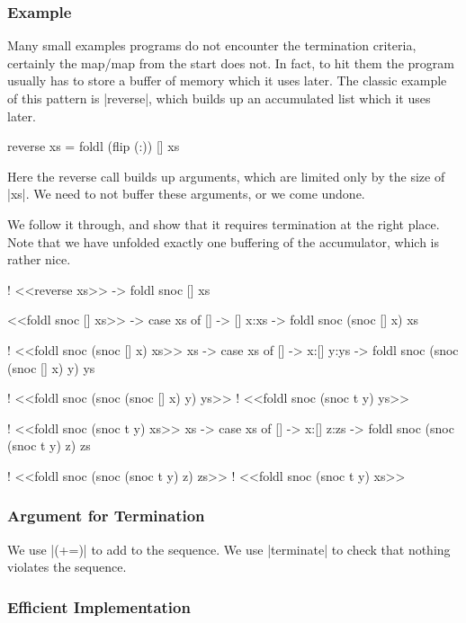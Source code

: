 \documentclass{sigplanconf}
\begin{document}
\subsubsection{Example}

Many small examples programs do not encounter the termination criteria, certainly the map/map from the start does not. In fact, to hit them the program usually has to store a buffer of memory which it uses later. The classic example of this pattern is |reverse|, which builds up an accumulated list which it uses later.

\begin{code}
reverse xs = foldl (flip (:)) [] xs
\end{code}

Here the reverse call builds up arguments, which are limited only by the size of |xs|. We need to not buffer these arguments, or we come undone.

We follow it through, and show that it requires termination at the right place. Note that we have unfolded exactly one buffering of the accumulator, which is rather nice.

\begin{code}
! <<reverse xs>>
\xs -> foldl snoc [] xs

<<foldl snoc [] xs>>
\xs -> case xs of
    [] -> []
    x:xs -> foldl snoc (snoc [] x) xs

! <<foldl snoc (snoc [] x) xs>>
\x xs -> case xs of
    [] -> x:[]
    y:ys -> foldl snoc (snoc (snoc [] x) y) ys

! <<foldl snoc (snoc (snoc [] x) y) ys>>
! <<foldl snoc (snoc t y) ys>>

! <<foldl snoc (snoc t y) xs>>
\x xs -> case xs of
    [] -> x:[]
    z:zs -> foldl snoc (snoc (snoc t y) z) zs

! <<foldl snoc (snoc (snoc t y) z) zs>>
! <<foldl snoc (snoc t y) xs>>
\end{code}


\subsubsection{Argument for Termination}

We use |(+=)| to add to the sequence. We use |terminate| to check that nothing violates the sequence.

\subsubsection{Efficient Implementation}
\end{document}
